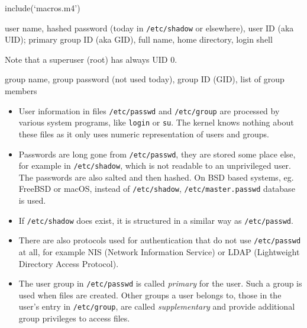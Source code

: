 include(`macros.m4')

\pagebreak
{}

\begin{slide}
\end{slide}

\begin{slide}
\begin{center}
\end{center}
\vspace{2ex}

 user name, 
hashed password (today in \texttt{/etc/shadow} or elsewhere), user ID (aka UID);
primary group ID (aka GID), full name, home directory, login shell

Note that a superuser (root) has always UID 0.

\vspace{2ex}
\begin{center}
\end{center}
\vspace{2ex}

 group name, group password (not
used today), group ID (GID), list of group members
\end{slide}

\begin{itemize}
\item User information in files \texttt{/etc/passwd} and \texttt{/etc/group} are
processed by various system programs, like \texttt{login} or \texttt{su}.
The kernel knows nothing about these files as it only uses numeric
representation of users and groups.
\item Passwords are long gone from \texttt{/etc/passwd}, they are stored some
place else, for example in \texttt{/etc/shadow}, which is not readable to an
unprivileged user.  The passwords are also salted and then hashed. On BSD based
systems, eg. FreeBSD or macOS, instead of \texttt{/etc/shadow},
\texttt{/etc/master.passwd} database is used.
\item If \texttt{/etc/shadow} does exist, it is structured in a similar way as
\texttt{/etc/passwd}.
\item There are also protocols used for authentication that do not use
\texttt{/etc/passwd} at all, for example NIS (Network Information Service) or
LDAP (Lightweight Directory Access Protocol).
\item The user group in \texttt{/etc/passwd} is called \emph{primary} for the
user.  Such a group is used when files are created.  Other groups a user belongs
to, those in the user's entry in \texttt{/etc/group}, are called
\emph{supplementary} and provide additional group privileges to access files.
\end{itemize}

